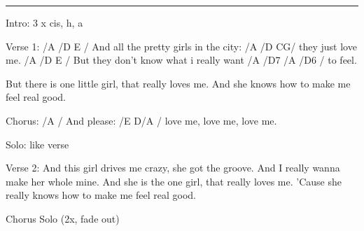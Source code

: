 \noindent\rule{\columnwidth}{1pt}

\begin{lstsong}
Intro: 3 x cis, h, a

Verse 1:
/A                 /D            E /
And all the pretty girls in the city:
/A            /D CG/
they just love me.
/A                      /D         E /
But they don't know what i really want
/A /D7    /A /D6 /
to feel.

But there is one little girl,
that really loves me.
And she knows how to make me
feel real good.

Chorus:
/A /
And please:
/E D/A /
love me,
love me,
love me.

Solo: like verse

Verse 2:
And this girl drives me crazy,
she got the groove.
And I really wanna make her
whole mine.
And she is the one girl,
that really loves me.
'Cause she really knows how to make me
feel real good.

Chorus
Solo (2x, fade out)
\end{lstsong}
\newpage
